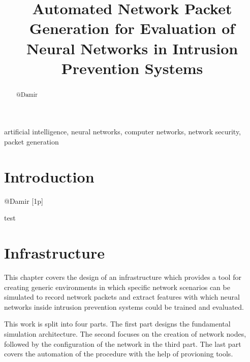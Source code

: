 \documentclass[conference]{IEEEtran}
\begin{document}
\title{Automated Network Packet Generation for Evaluation of Neural Networks in Intrusion Prevention Systems}

\author{
\and
{}
\and
{}
}

\maketitle

\begin{abstract}
@Damir
\end{abstract}

\begin{IEEEkeywords}
artificial intelligence, neural networks, computer networks, network security, packet generation
\end{IEEEkeywords}

\section{Introduction}
@Damir [1p]

\newpage
test
\newpage

\section{Infrastructure}

This chapter covers the design of an infrastructure which provides a tool for creating generic environments in which specific network scenarios can be simulated to record network packets and extract features with which neural networks inside intrusion prevention systems could be trained and evaluated.

This work is split into four parts. The first part designs the fundamental simulation architecture. The second focuses on the creation of network nodes, followed by the configuration of the network in the third part. The last part covers the automation of the procedure with the help of provioning tools.
\end{document}
